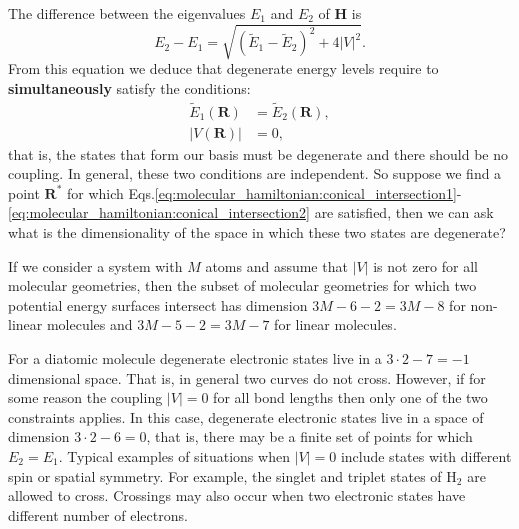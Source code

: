 \documentclass[../Main/chem532-notes.tex]{subfiles}
\begin{document}
The difference between the eigenvalues $E_1$ and $E_2$ of $\mathbf{H}$ is
\begin{equation}
E_2 - E_1 = \sqrt{(\tilde{E}_{1}-\tilde{E}_{2})^2 + 4 |V|^2 }.
\end{equation}
From this equation we deduce that degenerate energy levels require to \textbf{simultaneously} satisfy the conditions:
\begin{align}
\label{eq:molecular_hamiltonian:conical_intersection1}
\tilde{E}_{1}(\mathbf{R}) &= \tilde{E}_{2}(\mathbf{R}), \\
\label{eq:molecular_hamiltonian:conical_intersection2}
|V(\mathbf{R})| &= 0,
\end{align}
that is, the states that form our basis must be degenerate and there should be no coupling.
In general, these two conditions are independent. So suppose we find a point $\mathbf{R}^*$ for which Eqs.\eqref{eq:molecular_hamiltonian:conical_intersection1}-\eqref{eq:molecular_hamiltonian:conical_intersection2} are satisfied, then we can ask what is the dimensionality of the space in which these two states are degenerate?

If we consider a system with $M$ atoms and assume that $|V|$ is not zero for all molecular geometries, then the subset of molecular geometries for which two potential energy surfaces intersect has dimension $3M - 6 - 2 = 3M - 8$ for non-linear molecules and $3M - 5 - 2 = 3M - 7$ for linear molecules.

\begin{example}
For a diatomic molecule degenerate electronic states live in a $3 \cdot 2 - 7 = -1$ dimensional space.
That is, in general two curves do not cross.
However, if for some reason the coupling $|V| = 0$ for all bond lengths then only one of the two constraints applies.
In this case, degenerate electronic states live in a space of dimension $3 \cdot 2 - 6 = 0$, that is, there may be a finite set of points for which $E_2 = E_1$.
Typical examples of situations when $|V| = 0$ include states with different spin or spatial symmetry.  For example, the singlet and triplet states of H$_2$ are allowed to cross.
Crossings may also occur when two electronic states have different number of electrons.
\end{example}
\end{document}
